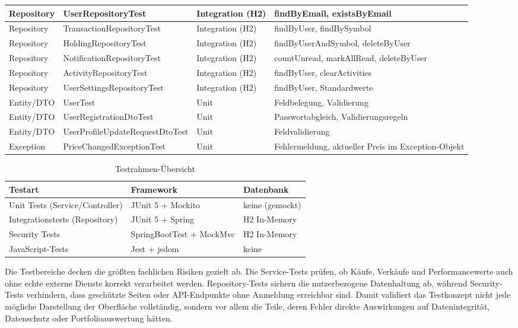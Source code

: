 \documentclass[12pt,a4paper]{article}
\begin{document}
\begin{table}[H]
{\begin{tabularx}{\textwidth}{|l|l|l|X|}
\hline
Repository & UserRepositoryTest & Integration (H2) & findByEmail, existsByEmail \\
\hline
Repository & TransactionRepositoryTest & Integration (H2) & findByUser, findBySymbol \\
\hline
Repository & HoldingRepositoryTest & Integration (H2) & findByUserAndSymbol, deleteByUser \\
\hline
Repository & NotificationRepositoryTest & Integration (H2) & countUnread, markAllRead, deleteByUser \\
\hline
Repository & ActivityRepositoryTest & Integration (H2) & findByUser, clearActivities \\
\hline
Repository & UserSettingsRepositoryTest & Integration (H2) & findByUser, Standardwerte \\
\hline
Entity/DTO & UserTest & Unit & Feldbelegung, Validierung \\
\hline
Entity/DTO & UserRegistrationDtoTest & Unit & Passwortabgleich, Validierungsregeln \\
\hline
Entity/DTO & UserProfileUpdateRequestDtoTest & Unit & Feldvalidierung \\
\hline
Exception & PriceChangedExceptionTest & Unit & Fehlermeldung, aktueller Preis im Exception-Objekt \\
\hline
\end{tabularx}
}
\end{table}

\begin{table}[H]
\centering
\caption*{Testrahmen-Übersicht}
{\footnotesize
\renewcommand{\arraystretch}{1.0}
\begin{tabularx}{\textwidth}{|l|l|X|}
\hline
\textbf{Testart} & \textbf{Framework} & \textbf{Datenbank} \\
\hline
Unit Tests (Service/Controller) & JUnit 5 + Mockito & keine (gemockt) \\
\hline
Integrationstests (Repository) & JUnit 5 + Spring & H2 In-Memory \\
\hline
Security Tests & SpringBootTest + MockMvc & H2 In-Memory \\
\hline
JavaScript-Tests & Jest + jsdom & keine \\
\hline
\end{tabularx}
}
\end{table}

Die Testbereiche decken die größten fachlichen Risiken gezielt ab. Die Service-Tests prüfen, ob Käufe, Verkäufe und Performancewerte auch ohne echte externe Dienste korrekt verarbeitet werden. Repository-Tests sichern die nutzerbezogene Datenhaltung ab, während Security-Tests verhindern, dass geschützte Seiten oder API-Endpunkte ohne Anmeldung erreichbar sind. Damit validiert das Testkonzept nicht jede mögliche Darstellung der Oberfläche vollständig, sondern vor allem die Teile, deren Fehler direkte Auswirkungen auf Datenintegrität, Datenschutz oder Portfolioauswertung hätten.
\end{document}
